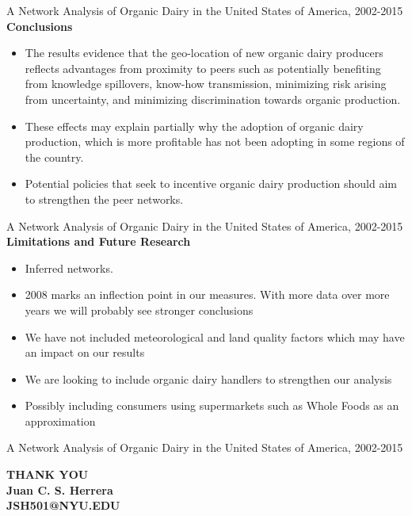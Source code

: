\documentclass[20]{beamer}
\begin{document}
\begin{frame}{A Network Analysis of Organic Dairy in the United States of America, 2002-2015}
\textbf{Conclusions}
\begin{itemize}
\item The results evidence that the geo-location of new organic dairy producers reflects advantages from proximity to peers such as potentially benefiting from knowledge spillovers, know-how transmission, minimizing risk arising from uncertainty, and minimizing discrimination towards organic production. 
\item These effects may explain partially why the adoption of organic dairy production, which is more profitable has not been adopting in some regions of the country. 
\item Potential policies that seek to incentive organic dairy production should aim to strengthen the peer networks.  
\end{itemize}
\end{frame}


\begin{frame}{A Network Analysis of Organic Dairy in the United States of America, 2002-2015}
\textbf{Limitations and Future Research}
\begin{itemize}
\item Inferred networks.
\item 2008 marks an inflection point in our measures. With more data over more years we will probably see stronger conclusions
\item We have not included meteorological and land quality factors which may have an impact on our results

\vspace{4mm}
\item We are looking to include organic dairy handlers to strengthen our analysis
\item Possibly including consumers using supermarkets such as Whole Foods as an approximation
\end{itemize}
\end{frame}


\begin{frame}{A Network Analysis of Organic Dairy in the United States of America, 2002-2015}
\begin{center} 
  \textbf{THANK YOU} \\
  \vspace{4mm}
  \textbf{Juan C. S. Herrera} \\
  \vspace{4mm}
  \textbf{JSH501@NYU.EDU}
\end{center}

\end{frame}
\end{document}
